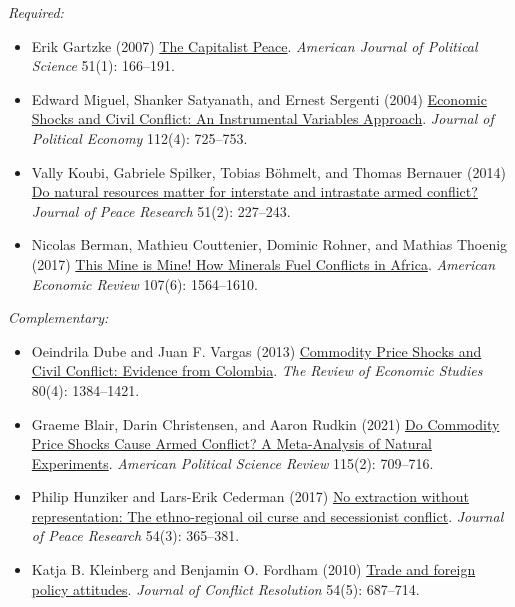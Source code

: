 \documentclass[12pt, a4paper]{article}
\begin{document}
\noindent\textit{Required:}

\begin{itemize}
  \item Erik Gartzke (2007) \href{https://doi.org/10.1111/j.1540-5907.2007.00244.x}{The Capitalist Peace}. \textit{American Journal of Political Science} 51(1): 166--191.
	\item Edward Miguel, Shanker Satyanath, and Ernest Sergenti (2004) \href{https://doi.org/10.1086/421174}{Economic Shocks and Civil Conflict: An Instrumental Variables Approach}. \textit{Journal of Political Economy} 112(4): 725--753.
	\item Vally Koubi, Gabriele Spilker, Tobias Böhmelt, and Thomas Bernauer (2014) \href{https://doi.org/10.1177/002234331349345}{Do natural resources matter for interstate and intrastate armed conflict?} \textit{Journal of Peace Research} 51(2): 227--243.
	\item Nicolas Berman, Mathieu Couttenier, Dominic Rohner, and Mathias Thoenig (2017) \href{https://doi.org/10.1257/aer.20150774}{This Mine is Mine! How Minerals Fuel Conflicts in Africa}. \textit{American Economic Review} 107(6): 1564--1610.
\end{itemize}

\noindent\textit{Complementary:}

\begin{itemize}
	\item Oeindrila Dube and Juan F. Vargas (2013) \href{https://doi.org/10.1093/restud/rdt009}{Commodity Price Shocks and Civil Conflict: Evidence from Colombia}. \textit{The Review of Economic Studies} 80(4): 1384--1421.
	\item Graeme Blair, Darin Christensen, and Aaron Rudkin (2021) \href{https://doi.org/10.1017/S0003055420000957}{Do Commodity Price Shocks Cause Armed Conflict? A Meta-Analysis of Natural Experiments}. \textit{American Political Science Review} 115(2): 709--716.
	\item Philip Hunziker and Lars-Erik Cederman (2017) \href{https://doi.org/10.1177/0022343316687365}{No extraction without representation: The ethno-regional oil curse and secessionist conflict}. \textit{Journal of Peace Research} 54(3): 365--381.
	\item Katja B. Kleinberg and Benjamin O. Fordham (2010) \href{https://doi.org/10.1177/0022002710364128}{Trade and foreign policy attitudes}. \textit{Journal of Conflict Resolution} 54(5): 687--714.
\end{itemize}
\end{document}

